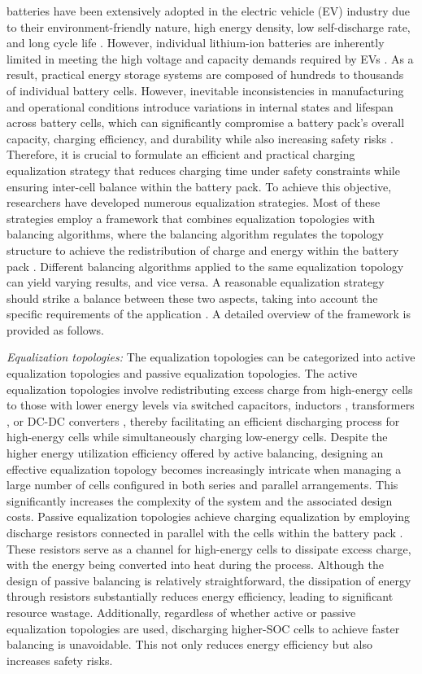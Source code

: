 \documentclass[journal]{IEEEtran}
\begin{document}
 batteries have been extensively adopted in the electric vehicle (EV) industry due to their environment-friendly nature, high energy density, low self-discharge rate, and long cycle life \cite{1, 2}. However, individual lithium-ion batteries are inherently limited in meeting the high voltage and capacity demands required by EVs \cite{3, 4}. As a result, practical energy storage systems are composed of hundreds to thousands of individual battery cells. However, inevitable inconsistencies in manufacturing and operational conditions introduce variations in internal states and lifespan across battery cells, which can significantly compromise a battery pack’s overall capacity, charging efficiency, and durability while also increasing safety risks \cite{5, 6}. Therefore, it is crucial to formulate an efficient and practical charging equalization strategy that reduces charging time under safety constraints while ensuring inter-cell balance within the battery pack. To achieve this objective, researchers have developed numerous equalization strategies. Most of these strategies employ a framework that combines equalization topologies with balancing algorithms, where the balancing algorithm regulates the topology structure to achieve the redistribution of charge and energy within the battery pack \cite{7, 8}. Different balancing algorithms applied to the same equalization topology can yield varying results, and vice versa. A reasonable equalization strategy should strike a balance between these two aspects, taking into account the specific requirements of the application \cite{ma2024two}. A detailed overview of the framework is provided as follows.

\noindent\textit{Equalization topologies:} The equalization topologies can be categorized into active equalization topologies and passive equalization topologies. The active equalization topologies involve redistributing excess charge from high-energy cells to those with lower energy levels via switched capacitors, inductors \cite{9}, transformers \cite{10}, or DC-DC converters \cite{11}, thereby facilitating an efficient discharging process for high-energy cells while simultaneously charging low-energy cells. Despite the higher energy utilization efficiency offered by active balancing, designing an effective equalization topology becomes increasingly intricate when managing a large number of cells configured in both series and parallel arrangements. This significantly increases the complexity of the system and the associated design costs. Passive equalization topologies achieve charging equalization by employing discharge resistors connected in parallel with the cells within the battery pack \cite{12}. These resistors serve as a channel for high-energy cells to dissipate excess charge, with the energy being converted into heat during the process. Although the design of passive balancing is relatively straightforward, the dissipation of energy through resistors substantially reduces energy efficiency, leading to significant resource wastage. Additionally, regardless of whether active or passive equalization topologies are used, discharging higher-SOC cells to achieve faster balancing is unavoidable. This not only reduces energy efficiency but also increases safety risks.
\end{document}
